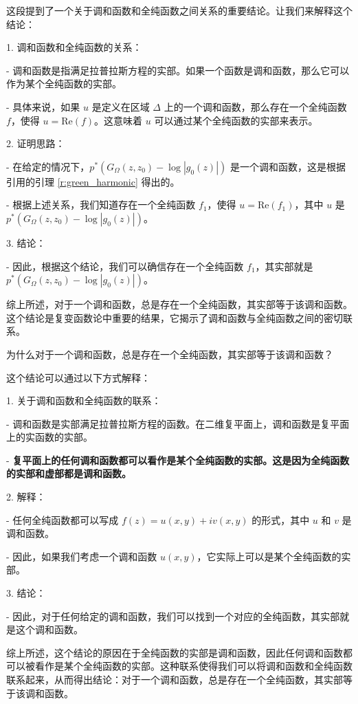 \begin{tcolorbox}[colback=Emerald!10,colframe=cyan!40!black,breakable,title=\textbf{ANNOTATION}]
  这段提到了一个关于调和函数和全纯函数之间关系的重要结论。让我们来解释这个结论：

1. 调和函数和全纯函数的关系：

   - 调和函数是指满足拉普拉斯方程的实部。如果一个函数是调和函数，那么它可以作为某个全纯函数的实部。

   - 具体来说，如果 $u$ 是定义在区域 $\Delta$ 上的一个调和函数，那么存在一个全纯函数 $f$，使得 $u = \text{Re}(f)$。这意味着 $u$ 可以通过某个全纯函数的实部来表示。

2. 证明思路：

   - 在给定的情况下，$p^{*}(G_{\Omega}(z,z_{0})-\log|g_{0}(z)|)$ 是一个调和函数，这是根据引用的引理 \ref{r:green_harmonic} 得出的。

   - 根据上述关系，我们知道存在一个全纯函数 $f_{1}$，使得 $u = \text{Re}(f_{1})$，其中 $u$ 是 $p^{*}(G_{\Omega}(z,z_{0})-\log|g_{0}(z)|)$。

3. 结论：

   - 因此，根据这个结论，我们可以确信存在一个全纯函数 $f_{1}$，其实部就是 $p^{*}(G_{\Omega}(z,z_{0})-\log|g_{0}(z)|)$。

综上所述，对于一个调和函数，总是存在一个全纯函数，其实部等于该调和函数。这个结论是复变函数论中重要的结果，它揭示了调和函数与全纯函数之间的密切联系。


为什么对于一个调和函数，总是存在一个全纯函数，其实部等于该调和函数？

这个结论可以通过以下方式解释：

1. 关于调和函数和全纯函数的联系：

   - 调和函数是实部满足拉普拉斯方程的函数。在二维复平面上，调和函数是复平面上的实函数的实部。

   - \textbf{复平面上的任何调和函数都可以看作是某个全纯函数的实部。这是因为全纯函数的实部和虚部都是调和函数。}

2. 解释：

   - 任何全纯函数都可以写成 $f(z) = u(x, y) + iv(x, y)$ 的形式，其中 $u$ 和 $v$ 是调和函数。

   - 因此，如果我们考虑一个调和函数 $u(x, y)$，它实际上可以是某个全纯函数的实部。

3. 结论：

   - 因此，对于任何给定的调和函数，我们可以找到一个对应的全纯函数，其实部就是这个调和函数。

综上所述，这个结论的原因在于全纯函数的实部是调和函数，因此任何调和函数都可以被看作是某个全纯函数的实部。这种联系使得我们可以将调和函数和全纯函数联系起来，从而得出结论：对于一个调和函数，总是存在一个全纯函数，其实部等于该调和函数。
  \end{tcolorbox}








